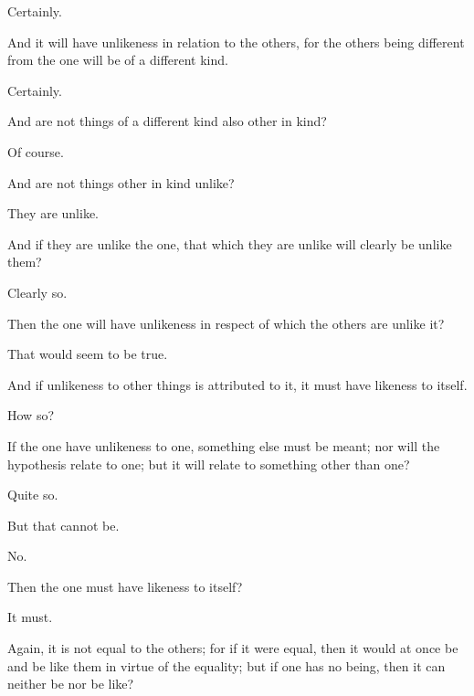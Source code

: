 \documentclass[11pt,letter]{article}
\begin{document}
\par  Certainly.

\par  And it will have unlikeness in relation to the others, for the others being different from the one will be of a different kind.

\par  Certainly.

\par  And are not things of a different kind also other in kind?

\par  Of course.

\par  And are not things other in kind unlike?

\par  They are unlike.

\par  And if they are unlike the one, that which they are unlike will clearly be unlike them?

\par  Clearly so.

\par  Then the one will have unlikeness in respect of which the others are unlike it?

\par  That would seem to be true.

\par  And if unlikeness to other things is attributed to it, it must have likeness to itself.

\par  How so?

\par  If the one have unlikeness to one, something else must be meant; nor will the hypothesis relate to one; but it will relate to something other than one?

\par  Quite so.

\par  But that cannot be.

\par  No.

\par  Then the one must have likeness to itself?

\par  It must.

\par  Again, it is not equal to the others; for if it were equal, then it would at once be and be like them in virtue of the equality; but if one has no being, then it can neither be nor be like?
\end{document}
